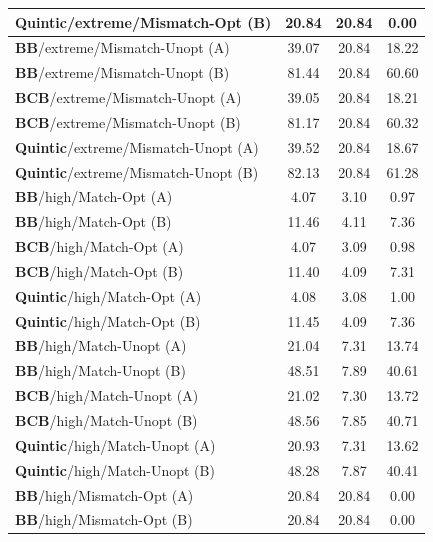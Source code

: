 \documentclass[11pt,a4paper]{article}
\begin{document}
\begin{longtable}{p{5cm}ccc}
\textbf{Quintic}/extreme/Mismatch-Opt (B) & \textcolor{bestcolor}{20.84} & 20.84 & 0.00 \\
\midrule
\textbf{BB}/extreme/Mismatch-Unopt (A) & 39.07 & \textcolor{bestcolor}{20.84} & 18.22 \\
\textbf{BB}/extreme/Mismatch-Unopt (B) & 81.44 & \textcolor{bestcolor}{20.84} & 60.60 \\
\midrule
\textbf{BCB}/extreme/Mismatch-Unopt (A) & 39.05 & \textcolor{bestcolor}{20.84} & 18.21 \\
\textbf{BCB}/extreme/Mismatch-Unopt (B) & 81.17 & \textcolor{bestcolor}{20.84} & 60.32 \\
\midrule
\textbf{Quintic}/extreme/Mismatch-Unopt (A) & 39.52 & \textcolor{bestcolor}{20.84} & 18.67 \\
\textbf{Quintic}/extreme/Mismatch-Unopt (B) & 82.13 & \textcolor{bestcolor}{20.84} & 61.28 \\
\midrule
\textbf{BB}/high/Match-Opt (A) & 4.07 & \textcolor{bestcolor}{3.10} & 0.97 \\
\textbf{BB}/high/Match-Opt (B) & 11.46 & \textcolor{bestcolor}{4.11} & 7.36 \\
\midrule
\textbf{BCB}/high/Match-Opt (A) & 4.07 & \textcolor{bestcolor}{3.09} & 0.98 \\
\textbf{BCB}/high/Match-Opt (B) & 11.40 & \textcolor{bestcolor}{4.09} & 7.31 \\
\midrule
\textbf{Quintic}/high/Match-Opt (A) & 4.08 & \textcolor{bestcolor}{3.08} & 1.00 \\
\textbf{Quintic}/high/Match-Opt (B) & 11.45 & \textcolor{bestcolor}{4.09} & 7.36 \\
\midrule
\textbf{BB}/high/Match-Unopt (A) & 21.04 & \textcolor{bestcolor}{7.31} & 13.74 \\
\textbf{BB}/high/Match-Unopt (B) & 48.51 & \textcolor{bestcolor}{7.89} & 40.61 \\
\midrule
\textbf{BCB}/high/Match-Unopt (A) & 21.02 & \textcolor{bestcolor}{7.30} & 13.72 \\
\textbf{BCB}/high/Match-Unopt (B) & 48.56 & \textcolor{bestcolor}{7.85} & 40.71 \\
\midrule
\textbf{Quintic}/high/Match-Unopt (A) & 20.93 & \textcolor{bestcolor}{7.31} & 13.62 \\
\textbf{Quintic}/high/Match-Unopt (B) & 48.28 & \textcolor{bestcolor}{7.87} & 40.41 \\
\midrule
\textbf{BB}/high/Mismatch-Opt (A) & \textcolor{bestcolor}{20.84} & 20.84 & 0.00 \\
\textbf{BB}/high/Mismatch-Opt (B) & \textcolor{bestcolor}{20.84} & 20.84 & 0.00 \\

\end{longtable}
\end{document}
